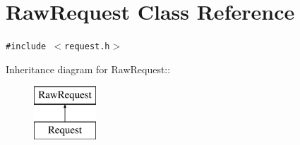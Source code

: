 \section{RawRequest Class Reference}
\label{classRawRequest}
{\tt \#include $<$request.h$>$}

Inheritance diagram for RawRequest::\begin{figure}[H]
\begin{center}
\leavevmode
\includegraphics[height=2cm]{classRawRequest}
\end{center}
\end{figure}
